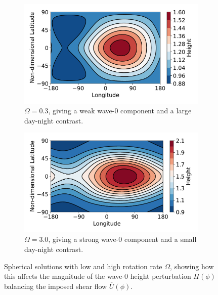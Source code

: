 \begin{figure}
  \centering
  \begin{subfigure}[t]{0.48\textwidth}
    \includegraphics[width=\textwidth]{figures/wave-mean-flow/spherical-low-omega.pdf}
    \caption{$\Omega = 0.3$, giving a weak wave-0 component and a large day-night contrast.}
    \label{fig:spherical-low-omega}
  \end{subfigure}
  \quad
  \begin{subfigure}[t]{0.48\textwidth}
    \includegraphics[width=\textwidth]{figures/wave-mean-flow/spherical-high-omega.pdf}
    \caption{$\Omega = 3.0$, giving a strong wave-0 component and a small day-night contrast.}
    \label{fig:spherical-high-omega}
  \end{subfigure}
  \caption{Spherical solutions with low and high rotation rate $\Omega$, showing how this affects the magnitude of the wave-0 height perturbation $\overline{H}(\phi)$ balancing the imposed shear flow $\overline{U}(\phi)$.}
  \label{fig:spherical-omega-effect}
\end{figure}

